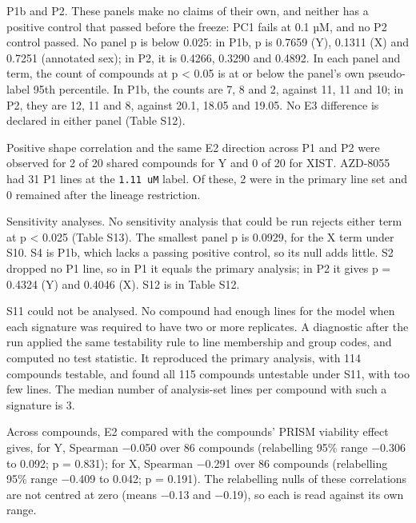 \documentclass[
  11pt,
  letterpaper,
]{article}
\begin{document}
P1b and P2. These panels make no claims of their own, and neither has a
positive control that passed before the freeze: PC1 fails at 0.1 µM, and
no P2 control passed. No panel p is below 0.025: in P1b, p is 0.7659
(Y), 0.1311 (X) and 0.7251 (annotated sex); in P2, it is 0.4266, 0.3290
and 0.4892. In each panel and term, the count of compounds at p
\textless{} 0.05 is at or below the panel's own pseudo-label 95th
percentile. In P1b, the counts are 7, 8 and 2, against 11, 11 and 10; in
P2, they are 12, 11 and 8, against 20.1, 18.05 and 19.05. No E3
difference is declared in either panel (Table S12).

Positive shape correlation and the same E2 direction across P1 and P2
were observed for 2 of 20 shared compounds for Y and 0 of 20 for XIST.
AZD-8055 had 31 P1 lines at the \texttt{1.11\ uM} label. Of these, 2
were in the primary line set and 0 remained after the lineage
restriction.

Sensitivity analyses. No sensitivity analysis that could be run rejects
either term at p \textless{} 0.025 (Table S13). The smallest panel p is
0.0929, for the X term under S10. S4 is P1b, which lacks a passing
positive control, so its null adds little. S2 dropped no P1 line, so in
P1 it equals the primary analysis; in P2 it gives p = 0.4324 (Y) and
0.4046 (X). S12 is in Table S12.

S11 could not be analysed. No compound had enough lines for the model
when each signature was required to have two or more replicates. A
diagnostic after the run applied the same testability rule to line
membership and group codes, and computed no test statistic. It
reproduced the primary analysis, with 114 compounds testable, and found
all 115 compounds untestable under S11, with too few lines. The median
number of analysis-set lines per compound with such a signature is 3.

Across compounds, E2 compared with the compounds' PRISM viability effect
gives, for Y, Spearman −0.050 over 86 compounds (relabelling 95\% range
−0.306 to 0.092; p = 0.831); for X, Spearman −0.291 over 86 compounds
(relabelling 95\% range −0.409 to 0.042; p = 0.191). The relabelling
nulls of these correlations are not centred at zero (means −0.13 and
−0.19), so each is read against its own range.
\end{document}
